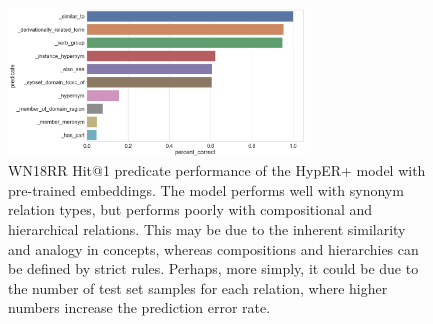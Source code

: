 \begin{figure} [H]
   	\centering
    	\includegraphics[width=0.7\textwidth, height=0.3\textheight]{WN18RR_relational_performance_results}
	\captionsetup{justification=centering}
	\caption{WN18RR Hit@1 predicate performance of the HypER+ model with pre-trained embeddings. The model performs well with synonym relation types, but performs poorly with compositional and hierarchical relations. This may be due to the inherent similarity and analogy in concepts, whereas compositions and hierarchies can be defined by strict rules. Perhaps, more simply, it could be due to the number of test set samples for each relation, where higher numbers increase the prediction error rate.}
\end{figure}

\bigskip
\bigskip
\bigskip
\bigskip

